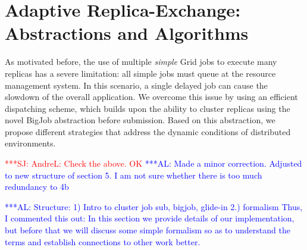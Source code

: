 \documentclass{rspublic}
\newcommand{\alnote}[1]{ {\textcolor{blue} { ***AL: #1 }}}
\newcommand{\jhanote}[1]{ {\textcolor{red} { ***SJ: #1 }}}
\newcommand{\alnote}[1]{}
\newcommand{\jhanote}[1]{}
\begin{document}


\section{Adaptive Replica-Exchange: Abstractions and Algorithms}
\label{sec:glidein}

As motivated before, the use of multiple {\it simple} Grid jobs to
execute many replicas has a severe limitation: all simple jobs must
queue at the resource management system. In this scenario, a single 
delayed job can cause the slowdown of the overall application. 
We overcome this issue by using an efficient dispatching scheme, 
which builds upon the ability to cluster replicas using the novel 
BigJob abstraction before submission. Based on this abstraction, we
propose different strategies that address the dynamic conditions
of distributed environments. 

\jhanote{AndreL: Check the above. OK}
\alnote{Made a minor correction. Adjusted to new structure of section 5. I
am not sure whether there is too much redundancy to 4b}


  \alnote{Structure: 1) Intro to cluster job sub, bigjob, glide-in 2.)
    formalism Thus, I commented this out: In this section we provide
    details of our implementation, but before that we will discuss
    some simple formalism so as to understand the terms and establish
    connections to other work better.  }
\end{document}
